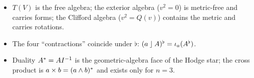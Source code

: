 \begin{keypoints}[Part I]
\begin{itemize}
\item $T(V)$ is the free algebra; the exterior algebra ($v^2=0$) is metric-free and carries forms; the Clifford algebra ($v^2=Q(v)$) contains the metric and carries rotations.
\item The four ``contractions'' coincide under $\flat$: $(a\mathbin{\rfloor} A)^\flat=\iota_a(A^\flat)$.
\item Duality $A^{\ast}=AI^{-1}$ is the geometric-algebra face of the Hodge star; the cross product is $a\times b=(a\wedge b)^{\ast}$ and exists only for $n=3$.
\end{itemize}
\end{keypoints}

